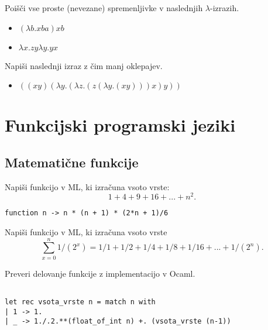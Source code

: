 \begin{ex}
Poi\v s\v ci vse proste (nevezane) spremenljivke v naslednjih $\lambda$-izrazih. 
\begin{itemize}
\item $(\lambda b.xba)xb$ 
\item $\lambda x.zy\lambda y.yx $
\end{itemize}
\end{ex}



\begin{ex}
Napi\v si naslednji izraz z \v cim manj oklepajev. 

 \begin{itemize}
 \item $((xy)(\lambda y.(\lambda z.(z(\lambda y.(xy)))x)y)) $
 \end{itemize}
\end{ex} 



\chapter{Funkcijski programski jeziki}


\section{Matemati\v cne funkcije}



\begin{ex}
Napi\v si funkcijo v ML, ki izra\v cuna vsoto vrste: 
$$1+4+9+16+...+n^2.$$

\begin{sol}
\begin{lstlisting}
function n -> n * (n + 1) * (2*n + 1)/6
\end{lstlisting}
\end{sol}

\end{ex}



\begin{ex}
Napi\v si funkcijo v ML, ki izra\v cuna vsoto vrste 
$$\sum_{x=0}^n 1/(2^x) = 1/1+1/2+1/4+1/8+1/16+...+1/(2^n).$$

Preveri delovanje funkcije z implementacijo v Ocaml.
\begin{sol}
\begin{lstlisting}
    
let rec vsota_vrste n = match n with
| 1 -> 1.
| _ -> 1./.2.**(float_of_int n) +. (vsota_vrste (n-1))
\end{lstlisting}
\end{sol}
\end{ex}



